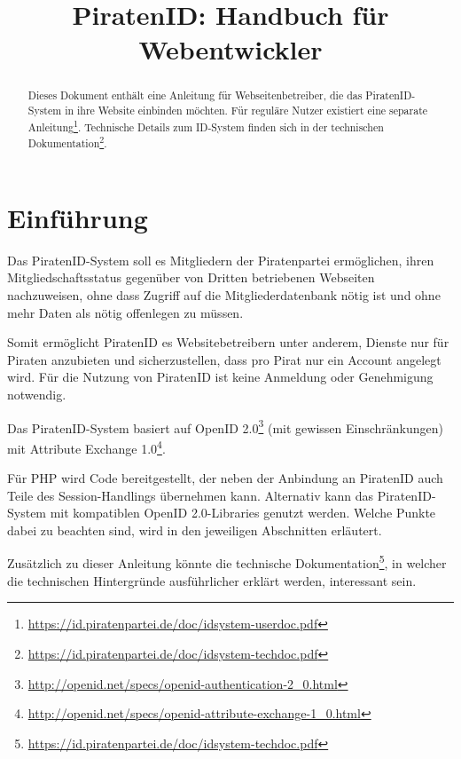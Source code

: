 

\title{PiratenID: Handbuch für Webentwickler}


\maketitle

\begin{abstract}\noindent
Dieses Dokument enthält eine Anleitung für Webseitenbetreiber, die das PiratenID-System in ihre Website einbinden möchten.
Für reguläre Nutzer existiert eine separate Anleitung\footnote{\url{https://id.piratenpartei.de/doc/idsystem-userdoc.pdf}}.
Technische Details zum ID-System finden sich in der technischen Dokumentation\footnote{\url{https://id.piratenpartei.de/doc/idsystem-techdoc.pdf}}.
\end{abstract}


\section{Einführung}
Das PiratenID-System soll es Mitgliedern der Piratenpartei ermöglichen, ihren Mitgliedschaftsstatus gegenüber von Dritten betriebenen Webseiten nachzuweisen,
ohne dass Zugriff auf die Mitgliederdatenbank nötig ist und ohne mehr Daten als nötig offenlegen zu müssen.

Somit ermöglicht PiratenID es Websitebetreibern unter anderem, Dienste nur für Piraten anzubieten und sicherzustellen, dass pro Pirat nur ein Account angelegt wird.
Für die Nutzung von PiratenID ist keine Anmeldung oder Genehmigung notwendig.

Das PiratenID-System basiert auf OpenID 2.0\footnote{\url{http://openid.net/specs/openid-authentication-2_0.html}} (mit gewissen Einschränkungen)
mit Attribute Exchange 1.0\footnote{\url{http://openid.net/specs/openid-attribute-exchange-1_0.html}}.

Für PHP wird Code bereitgestellt, der neben der Anbindung an PiratenID auch Teile des Session-Handlings übernehmen kann.
Alternativ kann das PiratenID-System mit kompatiblen OpenID 2.0-Libraries genutzt werden.
Welche Punkte dabei zu beachten sind, wird in den jeweiligen Abschnitten erläutert.

Zusätzlich zu dieser Anleitung könnte die technische Dokumentation\footnote{\url{https://id.piratenpartei.de/doc/idsystem-techdoc.pdf}},
in welcher die technischen Hintergründe ausführlicher erklärt werden, interessant sein.

\newpage
